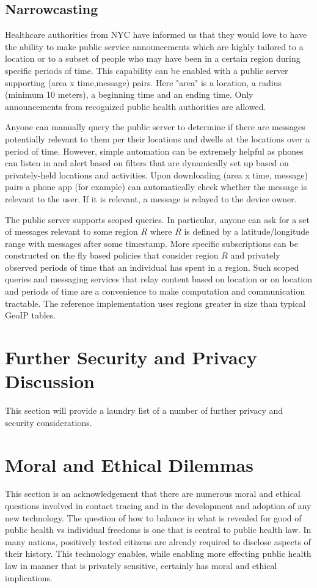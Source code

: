 \documentclass{article}
\begin{document}
\subsection{Narrowcasting}

Healthcare authorities from NYC have informed us that they would love to have the ability to make public service announcements which are highly tailored to a location or to a subset of people who may have been in a certain region during specific periods of time.  This capability can be enabled with a public server supporting (area x time,message) pairs.  Here "area" is a location, a radius (minimum 10 meters), a beginning time and an ending time.  Only announcements from recognized public health authorities are allowed.  

Anyone can manually query the public server to determine if there are messages potentially relevant to them per their locations and dwells at the locations over a period of time. However, simple automation can be extremely helpful as phones can listen in and alert based on filters that are dynamically set up based on privately-held locations and activities. Upon downloading (area x time, message) pairs a phone app (for example) can automatically check whether the message is relevant to the user.  If it is relevant, a message is relayed to the device owner.

The public server supports scoped queries.  In particular, anyone can ask for a set of messages relevant to some region $R$ where $R$ is defined by a latitude/longitude range with messages after some timestamp.  More specific subscriptions can be constructed on the fly based policies that consider region $R$ and privately observed periods of time that an individual has spent in a region. Such scoped queries and messaging services that relay content based on location or on location and periods of time are a convenience to make computation and communication tractable.  The reference implementation uses regions greater in size than typical GeoIP tables.

\section{Further Security and Privacy Discussion}
This section will provide a laundry list of a number of further privacy and security considerations.

\section{Moral and Ethical Dilemmas}
This section is an acknowledgement that there are numerous moral and ethical questions involved in contact tracing and in the development and adoption of any new technology. The question of how to balance in what is revealed for good of public health vs individual freedoms is one that is central to public health law. In many nations, positively tested citizens are already required to disclose aspects of their history.  This technology enables, while enabling more effecting public health law in manner that is privately sensitive, certainly has moral and ethical implications.  
\end{document}
